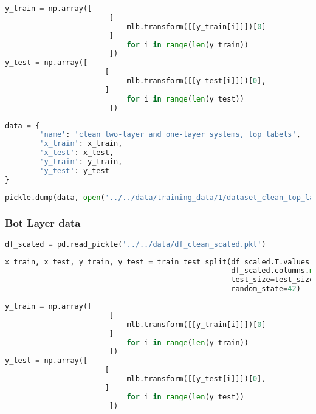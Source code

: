\begin{lstlisting}[language=Python]
y_train = np.array([    
                        [
                            mlb.transform([[y_train[i]]])[0]
                        ] 
                            for i in range(len(y_train))
                        ])
y_test = np.array([ 
                       [
                            mlb.transform([[y_test[i]]])[0],
                       ] 
                            for i in range(len(y_test))
                        ])
\end{lstlisting}

\begin{lstlisting}[language=Python]
data = {
        'name': 'clean two-layer and one-layer systems, top labels',
        'x_train': x_train,
        'x_test': x_test,
        'y_train': y_train,
        'y_test': y_test
}
\end{lstlisting}

\begin{lstlisting}[language=Python]
pickle.dump(data, open('../../data/training_data/1/dataset_clean_top_layer.pkl', 'wb'))
\end{lstlisting}

\hypertarget{bot-layer-data}{%
\subsubsection*{Bot Layer data}\label{bot-layer-data}}

\begin{lstlisting}[language=Python]
df_scaled = pd.read_pickle('../../data/df_clean_scaled.pkl')
\end{lstlisting}

\begin{lstlisting}[language=Python]
x_train, x_test, y_train, y_test = train_test_split(df_scaled.T.values,
                                                    df_scaled.columns.map(lambda x: x.split('_')[1]), # second part of the filename is the bot label
                                                    test_size=test_size_ratio,
                                                    random_state=42)
\end{lstlisting}

\begin{lstlisting}[language=Python]
y_train = np.array([    
                        [
                            mlb.transform([[y_train[i]]])[0]
                        ] 
                            for i in range(len(y_train))
                        ])
y_test = np.array([ 
                       [
                            mlb.transform([[y_test[i]]])[0],
                       ] 
                            for i in range(len(y_test))
                        ])
\end{lstlisting}

